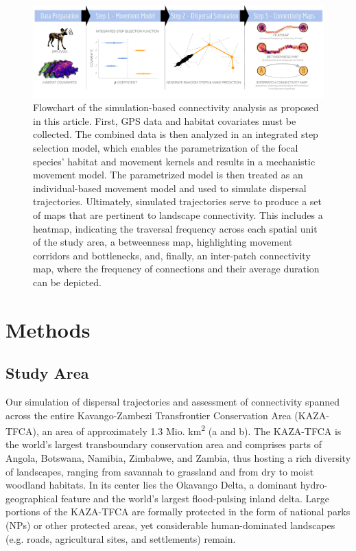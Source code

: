 \documentclass[abstract=on,10pt,a4paper,bibliography=totocnumbered]{article}
\begin{document}
\begin{figure}[htbp]
  \begin{center}
    \includegraphics[width = \textwidth]{99_GraphicalAbstract2.pdf}
    \caption{Flowchart of the simulation-based connectivity analysis as proposed
    in this article. First, GPS data and habitat covariates must be
    collected. The combined data is then analyzed in an integrated step
    selection model, which enables the parametrization of the focal species'
    habitat and movement kernels and results in a mechanistic movement model.
    The parametrized model is then treated as an individual-based movement model
    and used to simulate dispersal trajectories. Ultimately, simulated
    trajectories serve to produce a set of maps that are pertinent to landscape
    connectivity. This includes a heatmap, indicating the traversal frequency
    across each spatial unit of the study area, a betweenness map, highlighting
    movement corridors and bottlenecks, and, finally, an inter-patch
    connectivity map, where the frequency of connections and their average
    duration can be depicted.}
    \label{GraphicalAbstract}
  \end{center}
\end{figure}

\section{Methods}
\subsection{Study Area}
Our simulation of dispersal trajectories and assessment of connectivity spanned
across the entire Kavango-Zambezi Transfrontier Conservation Area (KAZA-TFCA),
an area of approximately 1.3 Mio. km\textsuperscript{2} (a and
b). The KAZA-TFCA is the world's largest transboundary conservation area and
comprises parts of Angola, Botswana, Namibia, Zimbabwe, and Zambia, thus hosting
a rich diversity of landscapes, ranging from savannah to grassland and from dry
to moist woodland habitats. In its center lies the Okavango Delta, a dominant
hydro-geographical feature and the world's largest flood-pulsing inland delta.
Large portions of the KAZA-TFCA are formally protected in the form of national
parks (NPs) or other protected areas, yet considerable human-dominated
landscapes (e.g. roads, agricultural sites, and settlements) remain.
\end{document}
